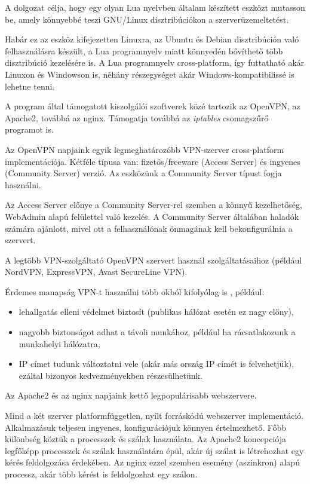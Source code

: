 
A dolgozat célja, hogy egy olyan Lua nyelvben általam készített eszközt mutasson be, amely könnyebbé teszi GNU/Linux disztribúciókon a szerverüzemeltetést.

Habár ez az eszköz kifejezetten Linuxra, az Ubuntu és Debian disztribúción való felhasználásra készült, a Lua programnyelv miatt könnyedén bővíthető több disztribúció kezelésére is. A Lua programnyelv cross-platform, így futtatható akár Linuxon és Windowson is, néhány részegységet akár Windows-kompatibilissé is lehetne tenni.

A program által támogatott kiszolgálói szoftverek közé tartozik az OpenVPN, az Apache2, továbbá az nginx. Támogatja továbbá az \textit{iptables} csomagszűrő programot is.

\medskip

Az OpenVPN napjaink egyik legmeghatározóbb VPN-szerver cross-platform implementációja. Kétféle típusa van: fizetős/freeware (Access Server) és ingyenes (Community Server) verzió. Az eszközünk a Community Server típust fogja használni.

Az Access Server előnye a Community Server-rel szemben a könnyű kezelhetőség, WebAdmin alapú felülettel való kezelés. 
A Community Server általában haladók számára ajánlott, mivel ott a felhasználónak önmagának kell bekonfigurálnia a szervert.

A legtöbb VPN-szolgáltató OpenVPN szervert használ szolgáltatásaihoz (például NordVPN, ExpressVPN, Avast SecureLine VPN). \cite{whatisopenvpn}

Érdemes manapság VPN-t használni több okból kifolyólag is \cite{usageofvpn}, például:
\begin{itemize}
  \item lehallgatás elleni védelmet biztosít (publikus hálózat esetén ez nagy előny),
  \item nagyobb biztonságot adhat a távoli munkához, például ha rácsatlakozunk a munkahelyi hálózatra,
  \item IP címet tudunk változtatni vele (akár más ország IP címét is felvehetjük), ezáltal bizonyos kedvezményekben részesülhetünk.
\end{itemize}

\medskip
Az Apache2 és az nginx napjaink kettő legpopulárisabb webszervere. \cite{webservermarketshare}

Mind a két szerver platformfüggetlen, nyílt forráskódú webszerver implementáció. Alkalmazásuk teljesen ingyenes, konfigurációjuk könnyen értelmezhető. Főbb különbség köztük a processzek és szálak használata. Az Apache2 koncepciója legfőképp processzek és szálak használatára épül, akár új szálat is létrehozhat egy kérés feldolgozása érdekében. Az nginx ezzel szemben esemény (aszinkron) alapú processz, akár több kérést is feldolgozhat egy szálon.

